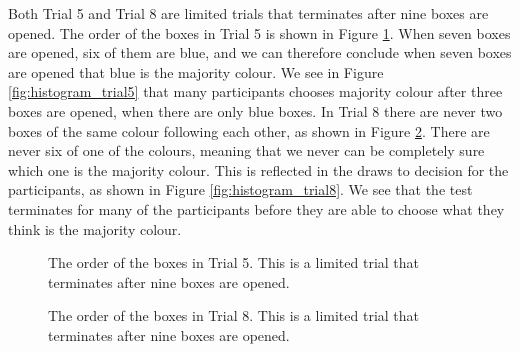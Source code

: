 Both Trial 5 and Trial 8 are limited trials that terminates after nine boxes are opened. The order of the boxes in Trial 5 is shown in Figure \ref{fig:trial5_order}. When seven boxes are opened, six of them are blue, and we can therefore conclude when seven boxes are opened that blue is the majority colour. We see in Figure \ref{fig:histogram_trial5} that many participants chooses majority colour after three boxes are opened, when there are only blue boxes. In Trial 8 there are never two boxes of the same colour following each other, as shown in Figure \ref{fig:trial8_order}. There are never six of one of the colours, meaning that we never can be completely sure which one is the majority colour. This is reflected in the draws to decision for the participants, as shown in Figure \ref{fig:histogram_trial8}. We see that the test terminates for many of the participants before they are able to choose what they think is the majority colour. 
\begin{figure}
    \centering
    \scalebox{0.8}{}
    \caption[Order of boxes in Trial 5]{The order of the boxes in Trial 5. This is a limited trial that terminates after nine boxes are opened.}
    \label{fig:trial5_order}
\end{figure}
\begin{figure}
    \centering
    \scalebox{0.8}{}
    \caption[Order of boxes in Trial 8]{The order of the boxes in Trial 8. This is a limited trial that terminates after nine boxes are opened.}
    \label{fig:trial8_order}
\end{figure}
